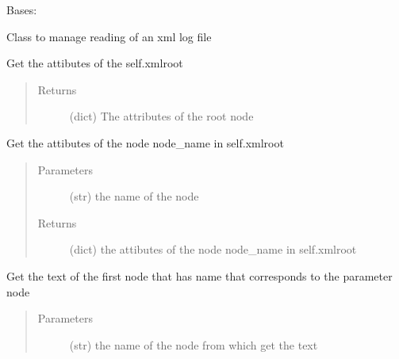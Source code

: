 \documentclass[a4paper,10pt,english]{sphinxmanual}
\begin{document}
\begin{fulllineitems}
\label{\detokenize{apidoc_src/src:src.xmlManager.ReadXmlFile}}
Bases: 

Class to manage reading of an xml log file

\begin{fulllineitems}
\label{\detokenize{apidoc_src/src:src.xmlManager.ReadXmlFile.getRootAttrib}}
Get the attibutes of the self.xmlroot
\begin{quote}\begin{description}
\item[{Returns}] \leavevmode
(dict) The attributes of the root node

\end{description}\end{quote}

\end{fulllineitems}


\begin{fulllineitems}
\label{\detokenize{apidoc_src/src:src.xmlManager.ReadXmlFile.get_attrib}}
Get the attibutes of the node node\_name in self.xmlroot
\begin{quote}\begin{description}
\item[{Parameters}] \leavevmode
{} \textendash{} (str) the name of the node

\item[{Returns}] \leavevmode
(dict) the attibutes of the node node\_name in self.xmlroot

\end{description}\end{quote}

\end{fulllineitems}


\begin{fulllineitems}
\label{\detokenize{apidoc_src/src:src.xmlManager.ReadXmlFile.get_node_text}}
Get the text of the first node that has name 
that corresponds to the parameter node
\begin{quote}\begin{description}
\item[{Parameters}] \leavevmode
{} \textendash{} (str) the name of the node from which get the text


\end{description}
\end{quote}
\end{fulllineitems}
\end{fulllineitems}
\end{document}
